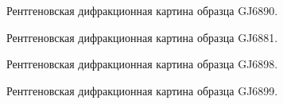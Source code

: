   \begin{figure}[ht]
    \caption{Рентгеновская дифракционная картина образца GJ6890.}\label{fig:fig}
  \end{figure}

  \begin{figure}[ht]
    \caption{Рентгеновская дифракционная картина образца GJ6881.}\label{fig:fig}
  \end{figure}

  \begin{figure}[ht]
    \caption{Рентгеновская дифракционная картина образца GJ6898.}\label{fig:fig}
  \end{figure}

  \begin{figure}[ht]
    \caption{Рентгеновская дифракционная картина образца GJ6899.}\label{fig:fig}
  \end{figure}